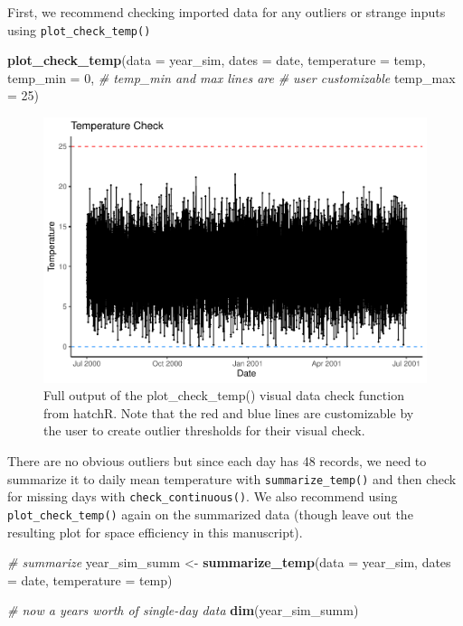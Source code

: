 \documentclass[10pt,a4paper,onecolumn]{article}
\newenvironment{Shaded}{\begin{snugshade}}{\end{snugshade}}
\newcommand{\AttributeTok}[1]{\textcolor[rgb]{0.13,0.29,0.53}{#1}}
\newcommand{\CommentTok}[1]{\textcolor[rgb]{0.56,0.35,0.01}{\textit{#1}}}
\newcommand{\DecValTok}[1]{\textcolor[rgb]{0.00,0.00,0.81}{#1}}
\newcommand{\FunctionTok}[1]{\textcolor[rgb]{0.13,0.29,0.53}{\textbf{#1}}}
\newcommand{\NormalTok}[1]{#1}
\newcommand{\OtherTok}[1]{\textcolor[rgb]{0.56,0.35,0.01}{#1}}
\begin{document}
First, we recommend checking imported data for any outliers or strange
inputs using \texttt{plot\_check\_temp()}

\begin{Shaded}
\begin{Highlighting}[]
\FunctionTok{plot\_check\_temp}\NormalTok{(}\AttributeTok{data =}\NormalTok{ year\_sim,}
                \AttributeTok{dates =}\NormalTok{ date,}
                \AttributeTok{temperature =}\NormalTok{ temp,}
                \AttributeTok{temp\_min =} \DecValTok{0}\NormalTok{, }\CommentTok{\# temp\_min and max lines are }
                              \CommentTok{\# user customizable}
                \AttributeTok{temp\_max =} \DecValTok{25}\NormalTok{)}
\end{Highlighting}
\end{Shaded}

\begin{figure}
\centering
\includegraphics{paper_files/figure-latex/unnamed-chunk-5-1.pdf}
\caption{Full output of the plot\_check\_temp() visual data check
function from hatchR. Note that the red and blue lines are customizable
by the user to create outlier thresholds for their visual check.}
\end{figure}

There are no obvious outliers but since each day has 48 records, we need
to summarize it to daily mean temperature with
\texttt{summarize\_temp()} and then check for missing days with
\texttt{check\_continuous()}. We also recommend using
\texttt{plot\_check\_temp()} again on the summarized data (though leave
out the resulting plot for space efficiency in this manuscript).

\begin{Shaded}
\begin{Highlighting}[]
\CommentTok{\# summarize}
\NormalTok{year\_sim\_summ }\OtherTok{\textless{}{-}} \FunctionTok{summarize\_temp}\NormalTok{(}\AttributeTok{data =}\NormalTok{ year\_sim,}
                                \AttributeTok{dates =}\NormalTok{ date,}
                                \AttributeTok{temperature =}\NormalTok{ temp)}

\CommentTok{\# now a year\textquotesingle{}s worth of single{-}day data}
\FunctionTok{dim}\NormalTok{(year\_sim\_summ)}
\end{Highlighting}
\end{Shaded}
\end{document}
